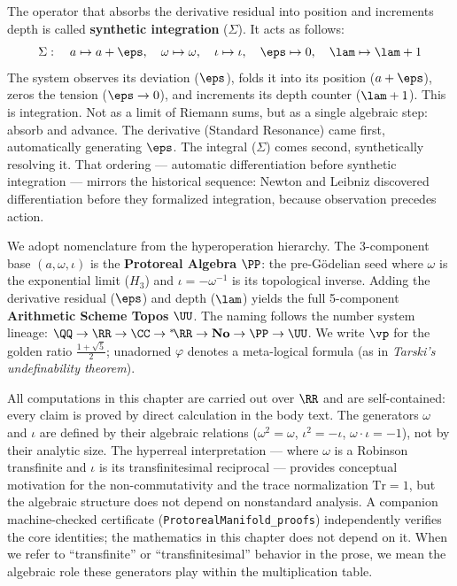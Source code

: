 The operator that absorbs the derivative residual into position and increments depth is called \textbf{synthetic integration} ($\Sigma$). It acts as follows:
$$\Sigma: \quad a \mapsto a + \eps, \quad \omega \mapsto \omega, \quad \iota \mapsto \iota, \quad \eps \mapsto 0, \quad \lam \mapsto \lam + 1$$
The system observes its deviation ($\eps$), folds it into its position ($a + \eps$), zeros the tension ($\eps \to 0$), and increments its depth counter ($\lam + 1$). This is integration. Not as a limit of Riemann sums, but as a single algebraic step: absorb and advance. The derivative (Standard Resonance) came first, automatically generating $\eps$. The integral ($\Sigma$) comes second, synthetically resolving it. That ordering --- automatic differentiation before synthetic integration --- mirrors the historical sequence: Newton and Leibniz discovered differentiation before they formalized integration, because observation precedes action.

\begin{remark}\label{rem:hyper-tower}
We adopt nomenclature from the hyperoperation hierarchy. The 3-component base $(a, \omega, \iota)$ is the \textbf{Protoreal Algebra} $\PP$: the pre-G\"odelian seed where $\omega$ is the exponential limit ($H_3$) and $\iota = -\omega^{-1}$ is its topological inverse. Adding the derivative residual ($\eps$) and depth ($\lam$) yields the full 5-component \textbf{Arithmetic Scheme Topos} $\UU$. The naming follows the number system lineage: $\QQ \to \RR \to \CC \to {}^*\!\RR \to \mathbf{No} \to \PP \to \UU$. We write $\vp$ for the golden ratio $\tfrac{1+\sqrt{5}}{2}$; unadorned $\varphi$ denotes a meta-logical formula (as in \emph{Tarski's undefinability theorem}).
\end{remark}

\begin{remark}\label{rem:convention}
All computations in this chapter are carried out over $\RR$ and are
self-contained: every claim is proved by direct calculation in the body
text. The generators $\omega$ and $\iota$ are defined by their algebraic
relations ($\omega^2 = \omega$, $\iota^2 = -\iota$,
$\omega \cdot \iota = -1$), not by their analytic size. The hyperreal
interpretation --- where $\omega$ is a Robinson transfinite and $\iota$
is its transfinitesimal reciprocal --- provides conceptual motivation
for the non-commutativity and the trace normalization $\mathrm{Tr} = 1$,
but the algebraic structure does not depend on nonstandard analysis.
A companion machine-checked certificate
(\texttt{ProtorealManifold\_proofs}) independently verifies the
core identities; the mathematics in this chapter does not depend on it.
When we refer to ``transfinite'' or ``transfinitesimal'' behavior in the
prose, we mean the algebraic role these generators play within the
multiplication table.
\end{remark}

